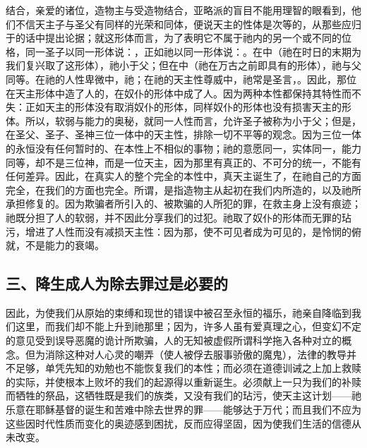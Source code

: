 结合，亲爱的诸位，造物主与受造物结合，亚略派的盲目不能用理智的眼看到，他们不信天主子与圣父有同样的光荣和同体，便说天主的性体是次等的，从那些应归于的话中提出论据；就这形体而言，为了表明它不属于祂内的另一个或不同的位格，同一圣子以同一形体说：，正如祂以同一形体说：。在中（祂在时日的末期为我们复兴取了这形体），祂小于父；但在中（祂在万古之前即具有的形体），祂与父同等。在祂的人性卑微中，祂；在祂的天主性尊威中，祂常是圣言，。因此，那位在天主形体中造了人的，在奴仆的形体中成了人。因为两种本性都保持其特性而不失：正如天主的形体没有取消奴仆的形体，同样奴仆的形体也没有损害天主的形体。所以，软弱与能力的奥秘，就同一人性而言，允许圣子被称为小于父；但是，在圣父、圣子、圣神三位一体中的天主性，排除一切不平等的观念。因为三位一体的永恒没有任何暂时的、在本性上不相似的事物；祂的意愿同一，实体同一，能力同等，却不是三位神，而是一位天主，因为那里有真正的、不可分的统一，不能有任何差异。因此，在真实人的整个完全的本性中，真天主诞生了，在祂自己的方面完全，在我们的方面也完全。所谓，是指造物主从起初在我们内所造的，以及祂所承担修复的。因为欺骗者所引入的、被欺骗的人所犯的罪，在救主身上没有痕迹；祂既分担了人的软弱，并不因此分享我们的过犯。祂取了奴仆的形体而无罪的玷污，增进了人性而没有减损天主性：因为那，使不可见者成为可见的，是怜悯的俯就，不是能力的衰竭。\par


\subsection{三、降生成人为除去罪过是必要的}

因此，为使我们从原始的束缚和现世的错误中被召至永恒的福乐，祂亲自降临到我们这里，而我们却不能上升到祂那里；因为，许多人虽有爱真理之心，但变幻不定的意见受到误导恶魔的诡计所欺骗，人的无知被虚假所谓科学拖入各种对立的概念。但为消除这种对人心灵的嘲弄（使人被俘去服事骄傲的魔鬼），法律的教导并不足够，单凭先知的劝勉也不能恢复我们的本性；而必须在道德训诫之上加上救赎的实际，并使根本上败坏的我们的起源得以重新诞生。必须献上一只为我们的补赎而牺牲的祭品，这牺牲既是我们的族类，又没有我们的玷污，使天主这计划——祂乐意在耶稣基督的诞生和苦难中除去世界的罪——能够达于万代；而且我们不应为这些因时代性质而变化的奥迹感到困扰，反而应得坚固，因为使我们生活的信德从未改变。\par

